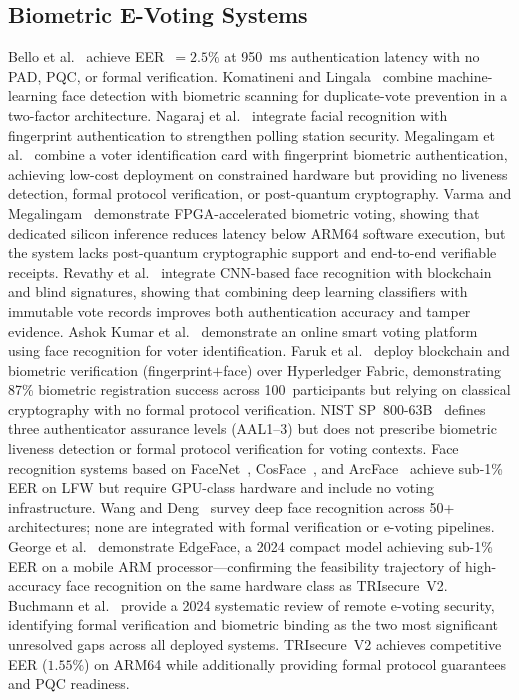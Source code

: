 \documentclass[pdflatex,sn-vancouver-num]{sn-jnl}%
\theoremstyle{thmstyleone}%
\theoremstyle{thmstyletwo}%
\theoremstyle{thmstylethree}%
\begin{document}
\subsection{Biometric E-Voting Systems}

Bello et al.~\cite{bello2021biometric} achieve EER~\(=2.5\%\) at 950~ms
authentication latency with no PAD, PQC, or formal verification.
Komatineni and
Lingala~\cite{komatineni2020biometric} combine machine-learning face detection
with biometric scanning for duplicate-vote prevention in a two-factor
architecture. Nagaraj et al.~\cite{nagaraj2022voting} integrate facial
recognition with fingerprint authentication to strengthen polling station
security. Megalingam et al.~\cite{megalingam2022voter} combine a voter
identification card with fingerprint biometric authentication, achieving
low-cost deployment on constrained hardware but providing no liveness
detection, formal protocol verification, or post-quantum cryptography.
Varma and Megalingam~\cite{varma2025fpga} demonstrate FPGA-accelerated
biometric voting, showing that dedicated silicon inference reduces latency
below ARM64 software execution, but the system lacks post-quantum
cryptographic support and end-to-end verifiable receipts. Revathy et al.~\cite{revathy2022cnn_evoting} integrate CNN-based
face recognition with blockchain and blind signatures, showing that combining
deep learning classifiers with immutable vote records improves both
authentication accuracy and tamper evidence. Ashok Kumar et
al.~\cite{ashokkumar2023smart} demonstrate an online smart voting platform
using face recognition for voter identification. Faruk et
al.~\cite{faruk2024transforming} deploy blockchain and biometric verification
(fingerprint\(+\)face) over Hyperledger Fabric, demonstrating 87\% biometric
registration success across 100~participants but relying on classical
cryptography with no formal protocol verification. NIST
SP~800-63B~\cite{nist_sp800_63b} defines three authenticator assurance levels
(AAL1--3) but does not prescribe biometric liveness detection or formal
protocol verification for voting contexts. Face recognition systems based on
FaceNet~\cite{schroff2015facenet}, CosFace~\cite{wang2018cosface}, and
ArcFace~\cite{deng2019arcface} achieve sub-1\% EER on LFW but require
GPU-class hardware and include no voting infrastructure. Wang and
Deng~\cite{wang2021face} survey deep face recognition across 50+ architectures;
none are integrated with formal verification or e-voting pipelines. George et
al.~\cite{george2024adaptive_biometric} demonstrate EdgeFace, a 2024 compact
model achieving sub-1\% EER on a mobile ARM processor---confirming the
feasibility trajectory of high-accuracy face recognition on the same hardware
class as TRIsecure~V2. Buchmann et al.~\cite{buchmann2024pvoting} provide a
2024 systematic review of remote e-voting security, identifying formal
verification and biometric binding as the two most significant unresolved gaps
across all deployed systems. TRIsecure~V2 achieves competitive EER
(\(1.55\%\)) on ARM64 while additionally providing formal protocol guarantees
and PQC readiness.
\end{document}
